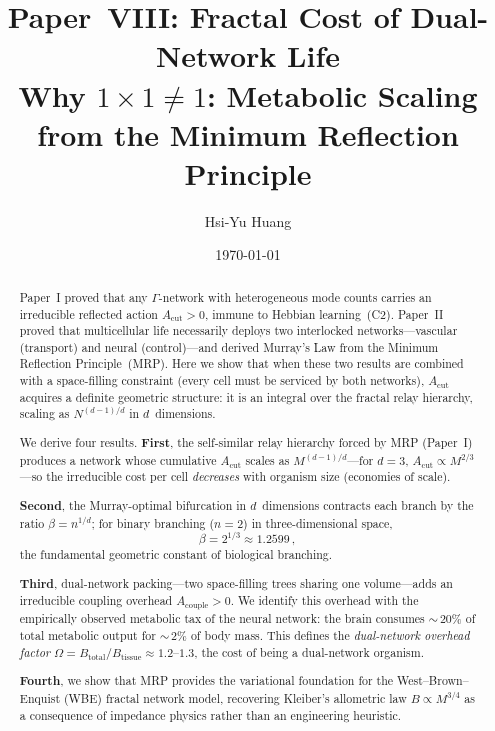 \documentclass[aps,pre,twocolumn,superscriptaddress,longbibliography]{revtex4-2}
\newcommand{\Acut}{A_{\text{cut}}}
\newcommand{\Acouple}{A_{\text{couple}}}
\begin{document}
\title{%
Paper~VIII: Fractal Cost of Dual-Network Life\\
\large Why $1 \times 1 \neq 1$: Metabolic Scaling from the
Minimum Reflection Principle%
}

\author{Hsi-Yu Huang}

\date{\today}

\begin{abstract}
Paper~I proved that any $\Gamma$-network with heterogeneous
mode counts carries an irreducible reflected action
$\Acut > 0$, immune to Hebbian learning~(C2).
Paper~II proved that multicellular life necessarily deploys
two interlocked networks---vascular (transport) and neural
(control)---and derived Murray's Law from the Minimum
Reflection Principle~(MRP).
Here we show that when these two results are combined
with a space-filling constraint (every cell must be
serviced by both networks), $\Acut$ acquires a definite
geometric structure: it is an integral over the fractal
relay hierarchy, scaling as $N^{(d-1)/d}$ in $d$~dimensions.

We derive four results.
\textbf{First}, the self-similar relay hierarchy forced
by MRP (Paper~I) produces a network whose cumulative
$\Acut$ scales as $M^{(d-1)/d}$---for $d = 3$,
$\Acut \propto M^{2/3}$---so the irreducible cost per
cell \emph{decreases} with organism size (economies of scale).

\textbf{Second}, the Murray-optimal bifurcation in
$d$~dimensions contracts each branch by the ratio
$\beta = n^{1/d}$; for binary branching ($n = 2$) in
three-dimensional space,
\begin{equation*}
  \beta = 2^{1/3} \approx 1.2599\,,
\end{equation*}
the fundamental geometric constant of biological branching.

\textbf{Third}, dual-network packing---two space-filling
trees sharing one volume---adds an irreducible coupling
overhead $\Acouple > 0$.
We identify this overhead with the empirically observed
metabolic tax of the neural network: the brain consumes
${\sim}\,20\%$ of total metabolic output for
${\sim}\,2\%$ of body mass.
This defines the \emph{dual-network overhead factor}
$\Omega = B_{\text{total}} / B_{\text{tissue}} \approx
1.2$--$1.3$, the cost of being a dual-network organism.

\textbf{Fourth}, we show that MRP provides the variational
foundation for the West--Brown--Enquist (WBE) fractal
network model, recovering Kleiber's allometric law
$B \propto M^{3/4}$ as a consequence of impedance physics
rather than an engineering heuristic.


\end{abstract}
\end{document}
